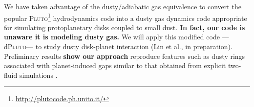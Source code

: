 We have taken advantage of the dusty/adiabatic gas equivalence to 
convert the popular
\textsc{Pluto}\footnote{\url{http://plutocode.ph.unito.it/}}      
hydrodynamics code \citep{mignone07} into a dusty gas dynamics code appropriate for
simulating protoplanetary disks coupled to small dust. {\bf In fact, our code is unaware it is modeling dusty gas.} 
We will apply 
this modified code ---d\textsc{Pluto}--- to study dusty disk-planet interaction (Lin et al., 
in preparation). 
Preliminary results {\bf show our approach} %
reproduce features such as dusty rings associated with 
planet-induced gaps similar to that obtained from explicit two-fluid
simulations \citep[e.g.][]{dong17}. 




